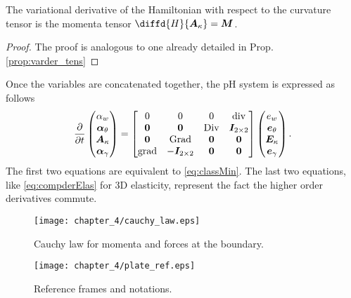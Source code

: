 \begin{proposition}
	The variational derivative of the Hamiltonian with respect to the curvature tensor is the momenta tensor $\diffd{H}{\bm{A}_{\kappa}} = \bm{M}$.
	\begin{proof}
		The proof is analogous to one already detailed in Prop. \ref{prop:varder_tens}
	\end{proof}
\end{proposition}

Once the variables are concatenated together, the pH system is expressed as follows
\begin{equation}
\diffp{}{t}
\begin{pmatrix}
\alpha_w \\
\bm\alpha_\theta \\
\bm{A}_\kappa \\
\bm\alpha_{\gamma} \\
\end{pmatrix} = 
\begin{bmatrix}
0  & 0  & 0  & \div \\
\bm{0} & \bm{0} &  \Div & \bm{I}_{2 \times 2}\\
\bm{0}  & \Grad  & \bm{0}  & \bm{0}\\
\grad & -\bm{I}_{2 \times 2} &  \bm{0} & \bm{0} \\
\end{bmatrix}
\begin{pmatrix}
e_w \\
\bm{e}_{\theta} \\
\bm{E}_{\kappa} \\
\bm{e}_{\gamma} \\
\end{pmatrix}.
\end{equation}
The first two equations are equivalent to \eqref{eq:classMin}. The last two equations, like \eqref{eq:compderElas} for 3D elasticity, represent the fact the higher order derivatives commute.


\begin{figure}[t]
	\centering
	\texttt{[image: chapter\_4/cauchy\_law.eps]}
	\caption{Cauchy law for momenta and forces at the boundary.}
	\label{fig:Cauchy_law}
\end{figure}
\begin{figure}[tb]
	\centering
	\texttt{[image: chapter\_4/plate\_ref.eps]}
	\caption{Reference frames and notations.}
	\label{fig:plate_ref}
\end{figure}

